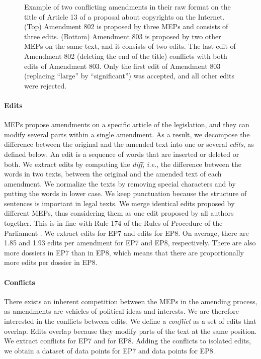 \begin{figure}
  \centering
	\newcommand{\imgscale}{\linewidth*3/4}
	{%
		\setlength{\fboxsep}{5.5pt}%
		\setlength{\fboxrule}{0.5pt}%
	}%
	\vfill
	\vspace{4pt}
	{%
		\setlength{\fboxsep}{5.5pt}%
		\setlength{\fboxrule}{0.5pt}%
	}%
	\caption{
		Example of two conflicting amendments in their raw format on the title of Article 13 of a proposal about copyrights on the Internet.
		(Top) Amendment 802 is proposed by three MEPs and consists of three edits.
		(Bottom) Amendment 803 is proposed by two other MEPs on the same text, and it consists of two edits.
		The last edit of Amendment 802 (deleting the end of the title) conflicts with both edits of Amendment 803.
		Only the first edit of Amendment 803 (replacing ``large'' by ``significant'') was accepted, and all other edits were rejected.
	}
	\label{lmp:fig:amendment}
\end{figure}

\paragraph{Edits}
MEPs propose amendments on a specific article of the legislation, and they can modify several parts within a single amendment.
As a result, we decompose the difference between the original and the amended text into one or several \emph{edits}, as defined below.
An edit is a sequence of words that are inserted or deleted or both.
We extract edits by computing the \emph{diff}, \textit{i.e.}, the difference between the words in two texts, between the original and the amended text of each amendment.
We normalize the texts by removing special characters and by putting the words in lower case.
We keep punctuation because the structure of sentences is important in legal texts.
We merge identical edits proposed by different MEPs, thus considering them as one edit proposed by all authors together.
This is in line with Rule 174 of the Rules of Procedure of the Parliament \cite{europarl2018rule174}.
We extract  edits for EP7 and  edits for EP8.
On average, there are 1.85 and 1.93 edits per amendment for EP7 and EP8, respectively.
There are also more dossiers in EP7 than in EP8, which means that there are proportionally more edits per dossier in EP8.

\paragraph{Conflicts}
There exists an inherent competition between the MEPs in the amending process, as amendments are vehicles of political ideas and interests.
We are therefore interested in the conflicts between edits.
We define a \emph{conflict} as a set of edits that overlap.
Edits overlap because they modify parts of the text at the same position.
We extract  conflicts for EP7 and  for EP8.
Adding the conflicts to isolated edits, we obtain a dataset of  data points for EP7 and  data points for EP8.


